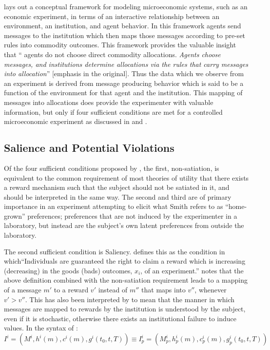 \documentclass[11pt,a4paper]{report}
\begin{document}
\textcite{Smith1982} lays out a conceptual framework for modeling microeconomic systems, such as an economic experiment, in terms of an interactive relationship between an environment, an institution, and agent behavior.
In this framework agents send messages to the institution which then maps those messages according to pre-set rules into commodity outcomes.
This framework provides the valuable insight that \enquote{\textelp{} agents do not choose direct commodity allocations.
\textit{Agents choose messages, and institutions determine allocations via the rules that carry messages into allocation}} [emphasis in the original]\parencite[926]{Smith1982}.
Thus the data which we observe from an experiment is derived from message producing behavior which is said to be a function of the environment for that agent and the institution.
This mapping of messages into allocations does provide the experimenter with valuable information, but only if four sufficient conditions are met for a controlled microeconomic experiment as discussed in \textcite{Smith1982} and \textcite{Harrison1989}.

\subsection{Salience and Potential Violations}

Of the four sufficient conditions proposed by \textcite{Smith1982}, the first, non-satiation, is equivalent to the common requirement of most theories of utility that there exists a reward mechanism such that the subject should not be satiated in it, and should be interpreted in the same way.
The second and third are of primary importance in an experiment attempting to elicit what Smith refers to as \enquote{home-grown} preferences; preferences that are not induced by the experimenter in a laboratory, but instead are the subject's own latent preferences from outside the laboratory.


The second sufficient condition is Saliency.
\textcite[931]{Smith1982} defines this as the condition in which\enquote{Individuals are guaranteed the right to claim a reward which is increasing (decreasing) in the goods (bads) outcomes, $x_i$, of an experiment.}
\textcite[223]{Harrison1994} notes that the above definition combined with the non-satiation requirement leads to a mapping of a message $m'$ to a reward $v'$ instead of $m''$ that maps into $v''$, whenever $v' > v''$.
This has also been interpreted by \textcite{Bruner2011} to mean that the manner in which messages are mapped to rewards by the institution is understood by the subject, even if it is stochastic, otherwise there exists an institutional failure to induce values.
In the syntax of \textcite{Smith1982}:
\begin{equation}
	\label{eq:S1982:I}
	I^i = \left(M^i,h^i(m),c^i(m),g^i(t_0,t,T) \right) \equiv I^i_p = \left(M^i_p, h^i_p(m) ,c^i_p(m), g^i_p(t_0,t,T) \right)
\end{equation}
\end{document}
